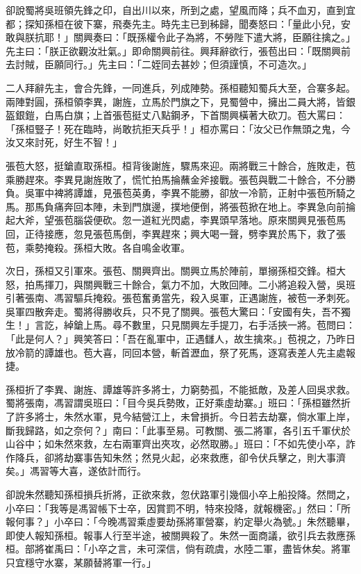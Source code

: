 卻說蜀將吳班領先鋒之印，自出川以來，所到之處，望風而降；兵不血刃，直到宜都；探知孫桓在彼下寨，飛奏先主。時先主已到秭歸，聞奏怒曰：「量此小兒，安敢與朕抗耶！」關興奏曰：「既孫權令此子為將，不勞陛下遣大將，臣願往擒之。」先主曰：「朕正欲觀汝壯氣。」即命關興前往。興拜辭欲行，張苞出曰：「既關興前去討賊，臣願同行。」先主曰：「二姪同去甚妙；但須謹慎，不可造次。」

二人拜辭先主，會合先鋒，一同進兵，列成陣勢。孫桓聽知蜀兵大至，合寨多起。兩陣對圓，孫桓領李異，謝旌，立馬於門旗之下，見蜀營中，擁出二員大將，皆銀盔銀鎧，白馬白旗；上首張苞挺丈八點鋼矛，下首關興橫著大砍刀。苞大罵曰：「孫桓豎子！死在臨時，尚敢抗拒天兵乎！」桓亦罵曰：「汝父已作無頭之鬼，今汝又來討死，好生不智！」

張苞大怒，挺鎗直取孫桓。桓背後謝旌，驟馬來迎。兩將戰三十餘合，旌敗走，苞乘勝趕來。李異見謝旌敗了，慌忙拍馬掄蘸金斧接戰。張苞與戰二十餘合，不分勝負。吳軍中裨將譚雄，見張苞英勇，李異不能勝，卻放一冷箭，正射中張苞所騎之馬。那馬負痛奔回本陣，未到門旗邊，撲地便倒，將張苞掀在地上。李異急向前掄起大斧，望張苞腦袋便砍。忽一道紅光閃處，李異頭早落地。原來關興見張苞馬回，正待接應，忽見張苞馬倒，李異趕來；興大喝一聲，劈李異於馬下，救了張苞，乘勢掩殺。孫桓大敗。各自鳴金收軍。

次日，孫桓又引軍來。張苞、關興齊出。關興立馬於陣前，單搦孫桓交鋒。桓大怒，拍馬揮刀，與關興戰三十餘合，氣力不加，大敗回陣。二小將追殺入營，吳班引著張南、馮習驅兵掩殺。張苞奮勇當先，殺入吳軍，正遇謝旌，被苞一矛刺死。吳軍四散奔走。蜀將得勝收兵，只不見了關興。張苞大驚曰：「安國有失，吾不獨生！」言訖，綽鎗上馬。尋不數里，只見關興左手提刀，右手活挾一將。苞問曰：「此是何人？」興笑答曰：「吾在亂軍中，正遇讎人，故生擒來。」苞視之，乃昨日放冷箭的譚雄也。苞大喜，同回本營，斬首瀝血，祭了死馬，逐寫表差人先主處報捷。

孫桓折了李異、謝旌、譚雄等許多將士，力窮勢孤，不能抵敵，及差人回吳求救。蜀將張南，馮習謂吳班曰：「目今吳兵勢敗，正好乘虛劫寨。」班曰：「孫桓雖然折了許多將士，朱然水軍，見今結營江上，未曾損折。今日若去劫寨，倘水軍上岸，斷我歸路，如之奈何？」南曰：「此事至易。可教關、張二將軍，各引五千軍伏於山谷中；如朱然來救，左右兩軍齊出夾攻，必然取勝。」班曰：「不如先使小卒，詐作降兵，卻將劫寨事告知朱然；然見火起，必來救應，卻令伏兵擊之，則大事濟矣。」馮習等大喜，遂依計而行。

卻說朱然聽知孫桓損兵折將，正欲來救，忽伏路軍引幾個小卒上船投降。然問之，小卒曰：「我等是馮習帳下士卒，因賞罰不明，特來投降，就報機密。」然曰：「所報何事？」小卒曰：「今晚馮習乘虛要劫孫將軍營寨，約定舉火為號。」朱然聽畢，即使人報知孫桓。報事人行至半途，被關興殺了。朱然一面商議，欲引兵去救應孫桓。部將崔禹曰：「小卒之言，未可深信，倘有疏虞，水陸二軍，盡皆休矣。將軍只宜穩守水寨，某願替將軍一行。」

